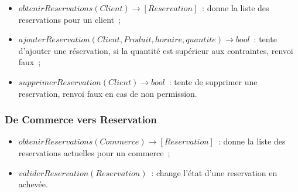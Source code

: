 \documentclass[a4paper,12pt]{article}
\begin{document}
\begin{itemize}
	\item $obtenirReservations(Client) \rightarrow [Reservation]$~: donne la liste des reservations pour un client~;
	\item $ajouterReservation(Client, Produit, horaire, quantite) \rightarrow bool$~: tente d'ajouter une réservation, si la quantité est supérieur aux contraintes, renvoi faux~;
	\item $supprimerReservation(Client) \rightarrow bool$~: tente de supprimer une reservation, renvoi faux en cas de non permission.
\end{itemize}

\subsubsection{De Commerce vers Reservation}

\begin{itemize}
	\item $obtenirReservations(Commerce) \rightarrow [Reservation]$~: donne la liste des reservations actuelles pour un commerce~;
	\item $validerReservation(Reservation)$~: change l'état d'une reservation en achevée.
\end{itemize}
\end{document}
